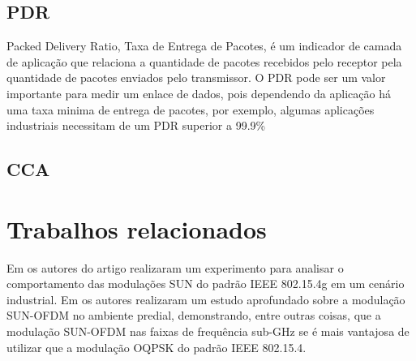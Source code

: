 \subsection*{PDR}
Packed Delivery Ratio, Taxa de Entrega de Pacotes, é um indicador de camada de aplicação que relaciona a quantidade de pacotes recebidos pelo receptor pela quantidade de pacotes enviados pelo transmissor. O PDR pode ser um valor importante para medir um enlace de dados, pois dependendo da aplicação há uma taxa minima de entrega de pacotes, por exemplo, algumas aplicações industriais necessitam de um PDR superior a 99.9\%

\subsection*{CCA}

\section{Trabalhos relacionados}
Em \cite{tuset2020dataset} os autores do artigo realizaram um experimento para analisar o comportamento das modulações SUN do padrão IEEE 802.15.4g em um cenário industrial. Em  \cite{munoz2018overview} os autores realizaram um estudo aprofundado sobre a modulação SUN-OFDM no ambiente predial, demonstrando, entre outras coisas, que a modulação SUN-OFDM nas faixas de frequência sub-GHz se é mais vantajosa de utilizar que a modulação OQPSK do padrão IEEE 802.15.4.
